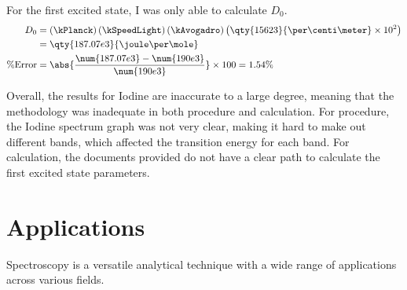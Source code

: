 \documentclass[12pt]{article}
\begin{document}
	For the first excited state, I was only able to calculate $D_0$.
	\begin{align*}
		D_0 &= \left( \kPlanck \right) \left( \kSpeedLight \right) \left( \kAvogadro \right) \left( \qty{15623}{\per\centi\meter} \times 10^2 \right) \\
		&= \qty{187.07e3}{\joule\per\mole} \\
		\% \text{Error} &= \abs{\frac{\num{187.07e3} - \num{190e3}}{\num{190e3}}} \times 100 = 1.54 \%
	\end{align*}
	
	Overall, the results for Iodine are inaccurate to a large degree, meaning that the methodology was inadequate in both procedure and calculation. For procedure, the Iodine spectrum graph was not very clear, making it hard to make out different bands, which affected the transition energy for each band. For calculation, the documents provided do not have a clear path to calculate the first excited state parameters.

\clearpage	

	\section{Applications}
	
	Spectroscopy is a versatile analytical technique with a wide range of applications across various fields.
	
\end{document}

